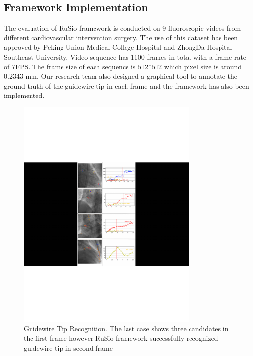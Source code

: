 \documentclass[journal]{IEEEtran}
\begin{document}
\subsection{Framework Implementation}
The evaluation of RuSio framework is conducted on 9 fluoroscopic videos from different cardiovascular intervention surgery. The use of this dataset has been approved by Peking Union Medical College Hospital and ZhongDa Hospital Southeast University. Video sequence has 1100 frames in total with a frame rate of 7FPS. The frame size of each sequence is 512*512 which pixel size is around 0.2343 mm. Our research team also designed a graphical tool to annotate the ground truth of the guidewire tip in each frame and the framework has also been implemented. 

\begin{figure}[!htb]
	\centering  
	\includegraphics[width=3.5in]{figures/figure6}
		\caption{Guidewire Tip Recognition. The last case shows three candidates in the first frame however RuSio framework successfully recognized guidewire tip in second frame} 
	\label{fig:mcmthesis-logo} 
\end{figure}
\end{document}
